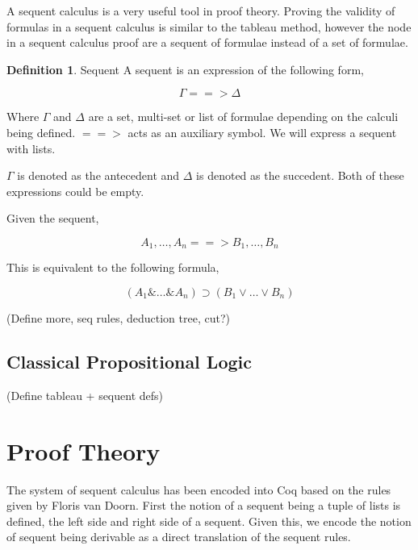 \documentclass{report}
\theoremstyle{definition}
\newtheorem{definition}{Definition}[section]
\begin{document}
A sequent calculus is a very useful tool in proof theory. Proving the validity
of formulas in a sequent calculus is similar to the tableau method, however the
node in a sequent calculus proof are a sequent of formulae instead of a set of
formulae.

\begin{definition}{Sequent}
A sequent is an expression of the following form,

\begin{equation*}
\Gamma ==> \Delta
\end{equation*}

Where $\Gamma$ and $\Delta$ are a set, multi-set or list of formulae depending
on the calculi being defined. $==>$ acts as an auxiliary symbol. We will
express a sequent with lists.

$\Gamma$ is denoted as the antecedent and $\Delta$ is denoted as the succedent.
Both of these expressions could be empty.

Given the sequent,

\begin{equation*}
A_1, \ldots, A_n ==> B_1, \ldots, B_n
\end{equation*}

This is equivalent to the following formula,

\begin{equation*}
(A_1 \& \ldots \& A_n) \supset (B_1 \vee \ldots \vee B_n)
\end{equation*}

\end{definition}

(Define more, seq rules, deduction tree, cut?)

\subsection{Classical Propositional Logic}

(Define tableau + sequent defs)

\section{Proof Theory}

The system of sequent calculus has been encoded into Coq based on the rules
given by Floris van Doorn. First the notion of a sequent being a tuple of lists
is defined, the left side and right side of a sequent. Given this, we encode
the notion of sequent being derivable as a direct translation of the sequent
rules.
\end{document}
